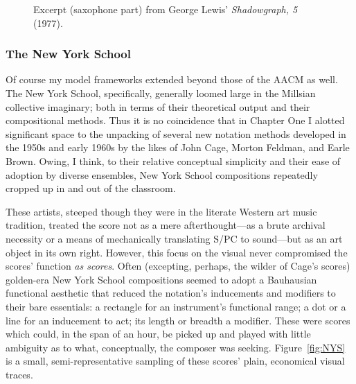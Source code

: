     \begin{figure}
        \centering
        \captionsetup{width=.5\textwidth}
        \caption[Excerpt (saxophone part) from George Lewis' \textit{Shadowgraph, 5} (1977).]{Excerpt (saxophone part) from George Lewis' \textit{Shadowgraph, 5} (1977).\footnotemark}
        \label{fig:Shadowgraph}
    \end{figure}

    \subsubsection{The New York School}
    Of course my model frameworks extended beyond those of the AACM as well. The New York School, specifically, generally loomed large in the Millsian collective imaginary; both in terms of their theoretical output and their compositional methods. Thus it is no coincidence that in Chapter One I alotted significant space to the unpacking of several new notation methods developed in the 1950s and early 1960s by the likes of John Cage, Morton Feldman, and Earle Brown. Owing, I think, to their relative conceptual simplicity and their ease of adoption by diverse ensembles, New York School compositions repeatedly cropped up in and out of the classroom.

    These artists, steeped though they were in the literate Western art music tradition, treated the score not as a mere afterthought---as a brute archival necessity or a means of mechanically translating S/PC to sound---but as an art object in its own right. However, this focus on the visual never compromised the scores' function \textit{as scores}. Often (excepting, perhaps, the wilder of Cage's scores) golden-era New York School compositions seemed to adopt a Bauhausian functional aesthetic that reduced the notation's inducements and modifiers to their bare essentials: a rectangle for an instrument's functional range; a dot or a line for an inducement to act; its length or breadth a modifier. These were scores which could, in the span of an hour, be picked up and played with little ambiguity as to what, conceptually, the composer was seeking. Figure~\ref{fig:NYS} is a small, semi-representative sampling of these scores' plain, economical visual traces.
    
